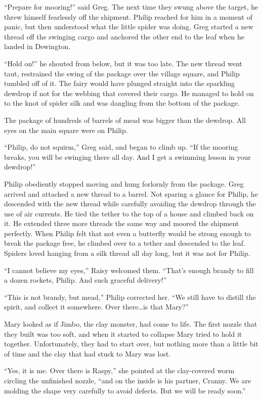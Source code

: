 \documentclass[10pt]{memoir}
\begin{document}
``Prepare for mooring!'' said Greg. The next time they swung above the target,
he threw himself fearlessly off the shipment. Philip reached for him in a
moment of panic, but then understood what the little spider was doing. Greg
started a new thread off the swinging cargo and anchored the other end to the
leaf when he landed in Dewington.

``Hold on!'' he shouted from below, but it was too late. The new thread went
taut, restrained the swing of the package over the village square, and Philip
tumbled off of it. The fairy would have plunged straight into the sparkling
dewdrop if not for the webbing that covered their cargo. He managed to hold on
to the knot of spider silk and was dangling from the bottom of the package.

The package of hundreds of barrels of mead was bigger than the dewdrop. All
eyes on the main square were on Philip.

``Philip, do not squirm,'' Greg said, and began to climb up. ``If the mooring
breaks, you will be swinging there all day. And I get a swimming lesson in your
dewdrop!''

Philip obediently stopped moving and hung forlornly from the package. Greg
arrived and attached a new thread to a barrel. Not sparing a glance for
Philip, he descended with the new thread while carefully avoiding the dewdrop
through the use of air currents. He tied the tether to the top of a house and
climbed back on it. He extended three more threads the same way and moored the
shipment perfectly. When Philip felt that not even a butterfly would be strong
enough to break the package free, he climbed over to a tether and descended to
the leaf. Spiders loved hanging from a silk thread all day long, but it was not
for Philip.

``I cannot believe my eyes,'' Raisy welcomed them. ``That's enough brandy to
fill a dozen rockets, Philip. And such graceful delivery!''

``This is not brandy, but mead,'' Philip corrected her. ``We still have to
distill the spirit, and collect it somewhere. Over there\dots is that Mary?''

Mary looked as if Jimbo, the clay monster, had come to life. The first nozzle
that they built was too soft, and when it started to collapse Mary tried to
hold it together. Unfortunately, they had to start over, but nothing more than
a little bit of time and the clay that had stuck to Mary was lost.

``Yes, it is me. Over there is Raspy,'' she pointed at the clay-covered worm
circling the unfinished nozzle, ``and on the inside is his partner, Cranny. We
are molding the shape very carefully to avoid defects. But we will be ready
soon.''
\end{document}
